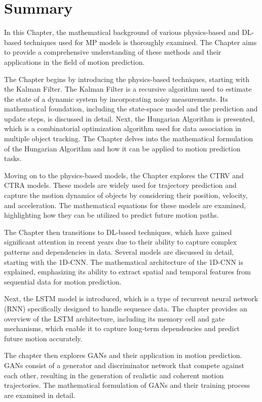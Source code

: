 \section{Summary}
\label{sec:3_summary}

In this Chapter, the mathematical background of various physics-based and \ac{DL}-based techniques used for \ac{MP} models is thoroughly examined. The Chapter aims to provide a comprehensive understanding of these methods and their applications in the field of motion prediction.

The Chapter begins by introducing the physics-based techniques, starting with the Kalman Filter. The Kalman Filter is a recursive algorithm used to estimate the state of a dynamic system by incorporating noisy measurements. Its mathematical foundation, including the state-space model and the prediction and update steps, is discussed in detail. Next, the Hungarian Algorithm is presented, which is a combinatorial optimization algorithm used for data association in multiple object tracking. The Chapter delves into the mathematical formulation of the Hungarian Algorithm and how it can be applied to motion prediction tasks.

Moving on to the physics-based models, the Chapter explores the \ac{CTRV} and \ac{CTRA} models. These models are widely used for trajectory prediction and capture the motion dynamics of objects by considering their position, velocity, and acceleration. The mathematical equations for these models are examined, highlighting how they can be utilized to predict future motion paths.

The Chapter then transitions to \ac{DL}-based techniques, which have gained significant attention in recent years due to their ability to capture complex patterns and dependencies in data. Several models are discussed in detail, starting with the 1D-\ac{CNN}. The mathematical architecture of the 1D-\ac{CNN} is explained, emphasizing its ability to extract spatial and temporal features from sequential data for motion prediction.

Next, the \ac{LSTM} model is introduced, which is a type of recurrent neural network (RNN) specifically designed to handle sequence data. The chapter provides an overview of the \ac{LSTM} architecture, including its memory cell and gate mechanisms, which enable it to capture long-term dependencies and predict future motion accurately.

The chapter then explores \acp{GAN} and their application in motion prediction. \acp{GAN} consist of a generator and discriminator network that compete against each other, resulting in the generation of realistic and coherent motion trajectories. The mathematical formulation of \acp{GAN} and their training process are examined in detail.

